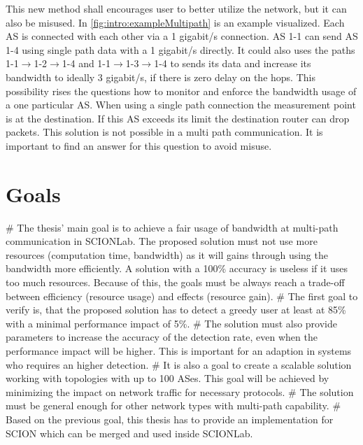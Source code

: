 \documentclass[thesis.tex]{subfiles}
\begin{document}
This new method shall encourages user to better utilize the network, but it can also be misused. In \autoref{fig:intro:exampleMultipath} is an example visualized. Each AS is connected with each other via a 1 gigabit/s connection. AS 1-1 can send AS 1-4 using single path data with a 1 gigabit/s directly. It could also uses the paths 1-1$\rightarrow$1-2$\rightarrow$1-4 and 1-1$\rightarrow$1-3$\rightarrow$1-4 to sends its data and increase its bandwidth to ideally 3 gigabit/s, if there is zero delay on the hops. This possibility rises the questions how to monitor and enforce the bandwidth usage of a one particular AS. When using a single path connection the measurement point is at the destination. If this AS exceeds its limit the destination router can drop packets. This solution is not possible in a multi path communication. It is important to find an answer for this question to avoid misuse.

\section{Goals} \label{sec:intro:goals}
     \begin{easylist}
        \MyNumberedListProperties
        # The thesis' main goal is to achieve a fair usage of bandwidth at multi-path communication in SCIONLab. The proposed solution must not use more resources (computation time, bandwidth) as it will gains through using the bandwidth more efficiently. A solution with a 100\% accuracy is useless if it uses too much resources. Because of this, the goals must be always reach a trade-off between efficiency (resource usage) and effects (resource gain).        
        # The first goal to verify is, that the proposed solution has to detect a greedy user at least at 85\% with a minimal performance impact of 5\%.         
        # The solution must also provide parameters to increase the accuracy of the detection rate, even when the performance impact will be higher. This is important for an adaption in systems who requires an higher detection.
        # It is also a goal to create a scalable solution working with topologies with up to 100 ASes. This goal will be achieved by minimizing the impact on network traffic for necessary protocols.        
        # The solution must be general enough for other network types with multi-path capability.        
        # Based on the previous goal, this thesis has to provide an implementation for SCION which can be merged and used inside SCIONLab.
    \end{easylist}
\end{document}
